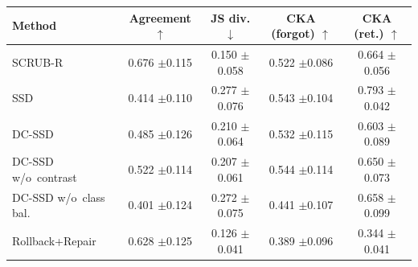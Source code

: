 \begin{tabular}{lcccc}
\toprule
Method & Agreement $\uparrow$ & JS div. $\downarrow$ & CKA (forgot) $\uparrow$ & CKA (ret.) $\uparrow$ \\
\midrule
SCRUB-R & 0.676 {\scriptsize$\pm$0.115} & 0.150 {\scriptsize$\pm$0.058} & 0.522 {\scriptsize$\pm$0.086} & 0.664 {\scriptsize$\pm$0.056} \\
SSD & 0.414 {\scriptsize$\pm$0.110} & 0.277 {\scriptsize$\pm$0.076} & 0.543 {\scriptsize$\pm$0.104} & 0.793 {\scriptsize$\pm$0.042} \\
DC-SSD & 0.485 {\scriptsize$\pm$0.126} & 0.210 {\scriptsize$\pm$0.064} & 0.532 {\scriptsize$\pm$0.115} & 0.603 {\scriptsize$\pm$0.089} \\
DC-SSD w/o~contrast & 0.522 {\scriptsize$\pm$0.114} & 0.207 {\scriptsize$\pm$0.061} & 0.544 {\scriptsize$\pm$0.114} & 0.650 {\scriptsize$\pm$0.073} \\
DC-SSD w/o~class bal. & 0.401 {\scriptsize$\pm$0.124} & 0.272 {\scriptsize$\pm$0.075} & 0.441 {\scriptsize$\pm$0.107} & 0.658 {\scriptsize$\pm$0.099} \\
Rollback+Repair & 0.628 {\scriptsize$\pm$0.125} & 0.126 {\scriptsize$\pm$0.041} & 0.389 {\scriptsize$\pm$0.096} & 0.344 {\scriptsize$\pm$0.041} \\
\bottomrule
\end{tabular}
